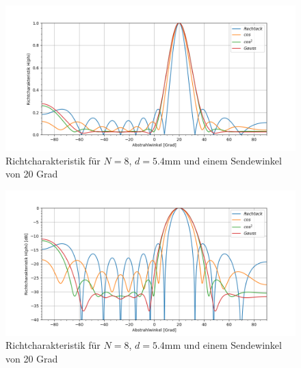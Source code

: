 \begin{figure}[htb]
\begin{center}
\includegraphics[width=\textwidth]{graphics/plot_grundlagen_characteristic_calc_aperture.png}
\end{center}
\caption{Richtcharakteristik für $N = 8$, $d = 5.4 \mathrm{mm}$ und einem Sendewinkel von 20 Grad} %
\label{fig:plot_grundlagen_characteristic_calc_aperture}
\end{figure}
%

\begin{figure}[htb]
\begin{center}
\includegraphics[width=\textwidth]{graphics/plot_grundlagen_characteristic_calc_aperture_log.png}
\end{center}
\caption{Richtcharakteristik für $N = 8$, $d = 5.4 \mathrm{mm}$ und einem Sendewinkel von 20 Grad} %
\label{fig:plot_grundlagen_characteristic_calc_aperture_log}
\end{figure}
%


